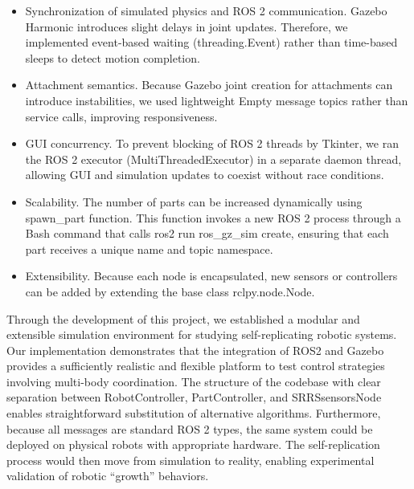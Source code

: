 \begin{itemize}
    
\item Synchronization of simulated physics and ROS 2 communication. Gazebo Harmonic 
introduces slight delays in joint updates. Therefore, we implemented 
event-based waiting (threading.Event) rather than time-based sleeps to detect 
motion completion.

\item Attachment semantics. Because Gazebo joint creation for attachments can 
introduce instabilities, we used lightweight Empty message topics rather 
than service calls, improving responsiveness.

\item GUI concurrency. To prevent blocking of ROS 2 threads by Tkinter, 
we ran the ROS 2 executor (MultiThreadedExecutor) in a separate daemon 
thread, allowing GUI and simulation updates to coexist without race conditions.

\item Scalability. The number of parts can be increased dynamically using spawn\_part
 function. This function invokes a new ROS 2 process through a Bash command that 
calls ros2 run ros\_gz\_sim create, ensuring that each part receives a 
unique name and topic namespace.

\item Extensibility. Because each node is encapsulated, new sensors or controllers 
can be added by extending the base class rclpy.node.Node.
\end{itemize}


Through the development of this project, we established a modular and 
extensible simulation environment for studying self-replicating robotic 
systems. Our implementation demonstrates that the integration of ROS2
and Gazebo  provides a sufficiently realistic and flexible 
platform to test control strategies involving  multi-body coordination. 
The structure of the codebase with
clear separation between RobotController, PartController, and SRRSsensorsNode
enables straightforward substitution of alternative algorithms.
Furthermore, because all messages are standard ROS 2 types, the same 
system could be deployed on physical robots with appropriate hardware.
The self-replication process would then move from simulation to reality,
enabling experimental validation of robotic “growth” behaviors.


